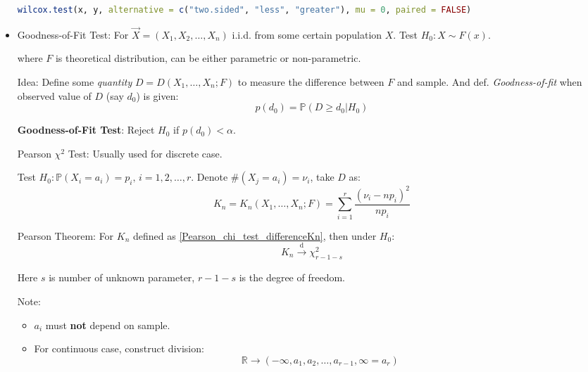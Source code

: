 \begin{itemize}
\begin{rcode}
\begin{lstlisting}[language=R]
wilcox.test(x, y, alternative = c("two.sided", "less", "greater"), mu = 0, paired = FALSE)
\end{lstlisting}
\end{rcode}




        \item Goodness-of-Fit Test: For $\vec{X}=(X_1,X_2,\ldots,X_n)$ i.i.d. from some certain population $X$. Test $H_0:X\sim F(x)$.
        
        where $F$ is theoretical distribution, can be either parametric or non-parametric.

        Idea: Define some \textit{quantity} $D=D(X_1,\ldots,X_n;F)$ to measure the difference between $F$ and sample. And def. \textit{Goodness-of-fit} when observed value of $D$ (say $d_0$) is given:
        \begin{equation}p(d_0)=\mathbb{P}(D\geq d_0|H_0)\end{equation}

        \textbf{Goodness-of-Fit Test}: Reject $H_0$ if $p(d_0)<\alpha$.


            Pearson $\chi^2$ Test: Usually used for discrete case. 
            
            Test $H_0:\mathbb{P}(X_i=a_i)=p_i,\, i=1,2,\ldots,r$. Denote $\#(X_j=a_i)=\nu_i$, take $D$ as:
            \begin{equation}\label{Pearson_chi_test_differenceKn}
                K_n=K_n(X_1,\ldots,X_n;F)=\sum_{i=1}^r\frac{(\nu_i-np_i)^2}{np_i}
            \end{equation}

            Pearson Theorem: For $K_n$ defined as \autoref{Pearson_chi_test_differenceKn}, then under $H_0$:
            \begin{equation}
                K_n\xrightarrow[]{\mathrm{d}}\chi^2_{r-1-s}
            \end{equation} 

            Here $s$ is number of unknown parameter, $r-1-s$ is the degree of freedom.

            Note:
            \begin{itemize}
                \item $a_i$ must \textbf{not} depend on sample.
                \item For continuous case, construct division:
                \begin{equation}\mathbb{R}\rightarrow(-\infty,a_1,a_2,\ldots,a_{r-1},\infty=a_r) \end{equation}


\end{itemize}
\end{itemize}

